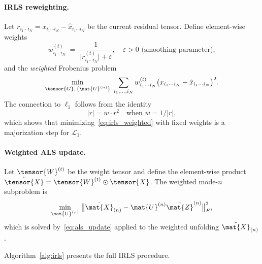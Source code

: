 \paragraph{IRLS reweighting.}
Let $r_{i_1 \cdots i_N} = x_{i_1 \cdots i_N} - \hat{x}_{i_1 \cdots i_N}$
be the current residual tensor.
Define element-wise weights
\begin{equation}
  w_{i_1 \cdots i_N}^{(t)}
  \;=\; \frac{1}{\bigl|r_{i_1 \cdots i_N}^{(t)}\bigr| + \varepsilon},
  \quad \varepsilon > 0 \text{ (smoothing parameter)},
  \label{eq:irls_weights}
\end{equation}
and the \emph{weighted} Frobenius problem
\begin{equation}
  \min_{\tensor{G},\, \{\mat{U}^{(n)}\}} \;
  \sum_{i_1, \ldots, i_N}
  w_{i_1 \cdots i_N}^{(t)}
  \bigl(x_{i_1 \cdots i_N} - \hat{x}_{i_1 \cdots i_N}\bigr)^2.
  \label{eq:irls_weighted}
\end{equation}
The connection to $\ell_1$ follows from the identity
\begin{equation}
  |r| = w \cdot r^2
  \quad \text{when } w = 1/|r|,
  \label{eq:irls_identity}
\end{equation}
which shows that minimizing~\eqref{eq:irls_weighted} with fixed weights
is a majorization step for $\mathcal{L}_1$.

\paragraph{Weighted ALS update.}
Let $\tensor{W}^{(t)}$ be the weight tensor and define the
element-wise product $\tilde{\tensor{X}} = \tensor{W}^{(t)} \odot \tensor{X}$.
The weighted mode-$n$ subproblem is
\begin{equation}
  \min_{\mat{U}^{(n)}} \;
  \bigl\|\tilde{\mat{X}}_{(n)} - \mat{U}^{(n)} \tilde{\mat{Z}}^{(n)}\bigr\|_F^2,
  \label{eq:irls_subproblem}
\end{equation}
which is solved by~\eqref{eq:als_update} applied to the weighted
unfolding $\tilde{\mat{X}}_{(n)}$.

Algorithm~\ref{alg:irls} presents the full IRLS procedure.

